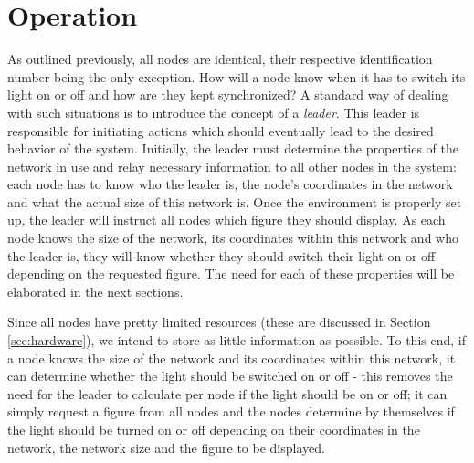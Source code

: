 \chapter{Operation}
\label{sec:operation}


As outlined previously, all nodes are identical, their respective identification number being the only exception. How will a node know when it has to switch its light on or off and how are they kept synchronized? A standard way of dealing with such situations is to introduce the concept of a \emph{leader}. This leader is responsible for initiating actions which should eventually lead to the desired behavior of the system. Initially, the leader must determine the properties of the network in use and relay necessary information to all other nodes in the system: each node has to know who the leader is, the node's coordinates in the network and what the actual size of this network is. Once the environment is properly set up, the leader will instruct all nodes which figure they should display. As each node knows the size of the network, its coordinates within this network and who the leader is, they will know whether they should switch their light on or off depending on the requested figure. The need for each of these properties will be elaborated in the next sections.


Since all nodes have pretty limited resources (these are discussed in Section \ref{sec:hardware}), we intend to store as little information as possible. To this end, if a node knows the size of the network and its coordinates within this network, it can determine whether the light should be switched on or off - this removes the need for the leader to calculate per node if the light should be on or off; it can simply request a figure from all nodes and the nodes determine by themselves if the light should be turned on or off depending on their coordinates in the network, the network size and the figure to be displayed.

